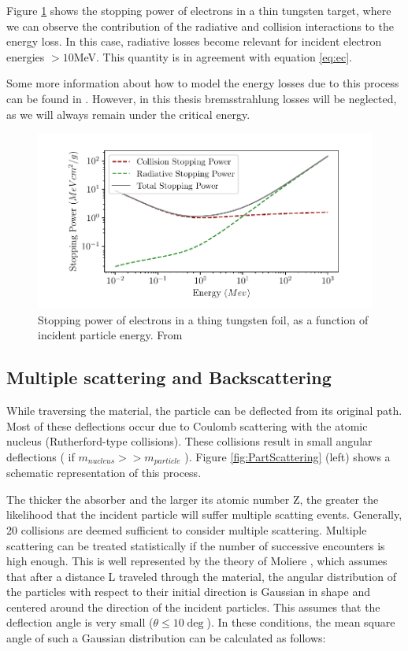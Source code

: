 Figure \ref{fig:BremssVSion} shows the stopping power of electrons in a thin tungsten target, where we can observe the contribution of the radiative and collision interactions to the energy loss. In this case, radiative losses become relevant for incident electron energies $> 10 $\si[]{\mega\electronvolt}. This quantity is in agreement with equation \ref{eq:ec}.  

Some more information about how to model the energy losses due to this process can be found in \parencite*[][]{ref:BremstutorialG4}. However, in this thesis bremsstrahlung losses will be neglected, as we will always remain under the critical energy. 

\begin{figure}[h]
    \centering
    \includegraphics[width=1.0\columnwidth]{Electron_Edep/ElectronEdep.pdf}
    \caption{Stopping power of electrons in a thing tungsten foil, as a function of incident particle energy. From \parencite*[][]{ref:NIST}}
    \label{fig:BremssVSion}
\end{figure}

\subsection{Multiple scattering and Backscattering}
\label{sus:Scatt}

While traversing the material, the particle can be deflected from its original path. Most of these deflections occur due to Coulomb scattering with the atomic nucleus (Rutherford-type collisions). These collisions result in small angular deflections ( if $m_{nucleus} >> m_{particle}$ ). Figure \ref{fig:PartScattering} (left) shows a schematic representation of this process. 

The thicker the absorber and the larger its atomic number Z, the greater the likelihood that the incident particle will suffer multiple scatting events. Generally, 20 collisions are deemed sufficient to consider multiple scattering. Multiple scattering can be treated statistically if the number of successive encounters is high enough. This is well represented by the theory of Moliere \parencite*[][]{ref:Moliere}, which assumes that after a distance L traveled through the material, the angular distribution of the particles with respect to their initial direction is Gaussian in shape and centered around the direction of the incident particles. This assumes that the deflection angle is very small ($\theta \leq 10 \deg $). In these conditions, the mean square angle of such a Gaussian distribution can be calculated as follows: 

